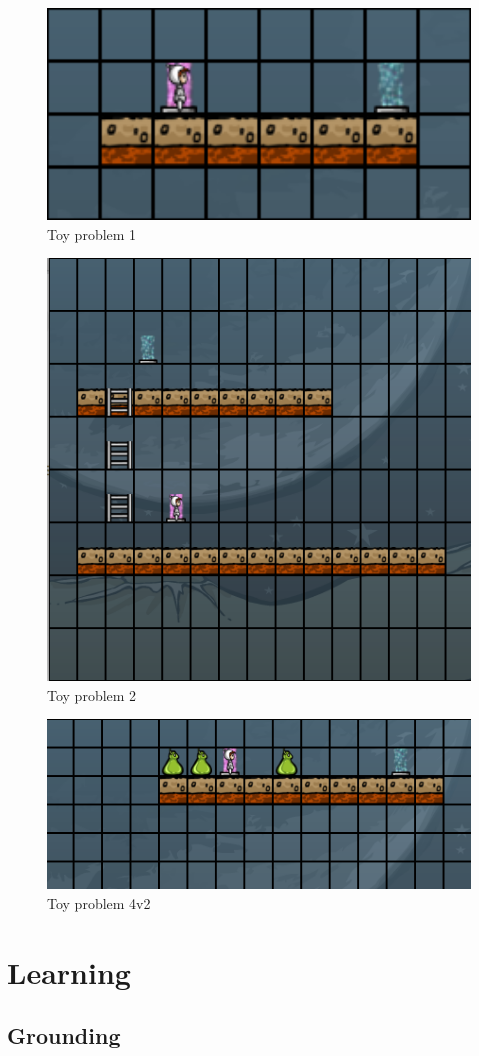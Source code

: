 \begin{figure}
	\centering
	\caption{Toy problem 1}
	\label{prob01}
	
	\includegraphics[width=1.0\textwidth]{appendix/img/prob01}
\end{figure}
\begin{figure}
	\centering
	\caption{Toy problem 2}
	\label{prob02}
	
	\includegraphics[width=1.0\textwidth]{appendix/img/prob02}
\end{figure}
\begin{figure}
	\centering
	\caption{Toy problem 4v2}
	\label{prob04v2}
	
	\includegraphics[width=1.0\textwidth]{appendix/img/prob04v2}
\end{figure}
\chapter{Learning}
\section{Grounding}
\label{grounding}

